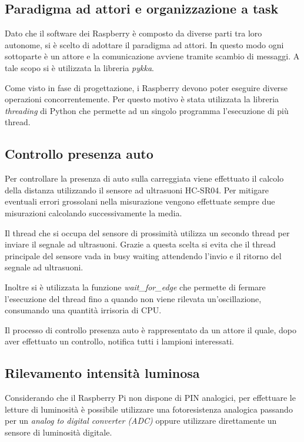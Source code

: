 \subsection{Paradigma ad attori e organizzazione a task}

Dato che il software dei Raspberry è composto da diverse parti tra loro autonome, si è scelto di adottare il paradigma ad attori.
In questo modo ogni sottoparte è un attore e la comunicazione avviene tramite scambio di messaggi.
A tale scopo si è utilizzata la libreria \textit{pykka}.

Come visto in fase di progettazione, i Raspberry devono poter eseguire diverse operazioni concorrentemente.
Per questo motivo è stata utilizzata la libreria \textit{threading} di Python che permette ad un singolo programma l'esecuzione di più thread.

\subsection{Controllo presenza auto \label{cpa}}

Per controllare la presenza di auto sulla carreggiata viene effettuato il calcolo della distanza utilizzando il sensore ad ultrasuoni HC-SR04. Per mitigare eventuali errori grossolani nella misurazione vengono effettuate sempre due misurazioni calcolando successivamente la media.

Il thread che si occupa del sensore di prossimità utilizza un secondo thread per inviare il segnale ad ultrasuoni.
Grazie a questa scelta si evita che il thread principale del sensore vada in busy waiting attendendo l'invio e il ritorno del segnale ad ultrasuoni.

Inoltre si è utilizzata la funzione \textit{wait\_for\_edge} che permette di fermare l'esecuzione del thread fino a quando non viene rilevata un'oscillazione, consumando una quantità irrisoria di CPU.

Il processo di controllo presenza auto è rappresentato da un attore il quale, dopo aver effettuato un controllo, notifica tutti i lampioni interessati.

\newpage


\subsection{Rilevamento intensità luminosa}

Considerando che il Raspberry Pi non dispone di PIN analogici, per effettuare le letture di luminosità è possibile utilizzare una fotoresistenza analogica passando per un \textit{analog to digital converter (ADC)} oppure utilizzare direttamente un sensore di luminosità digitale.

